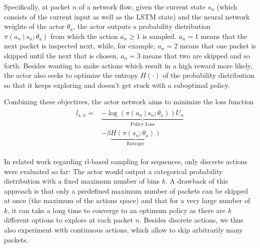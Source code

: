 \documentclass[conference]{IEEEtran}
\newcommand\givenbase[1][]{\:#1\lvert\:}
\let\given\givenbase
\begin{document}
Specifically, at packet $n$ of a network flow, given the current state $s_n$ (which consists of the current input as well as the LSTM state) and the neural network weights of the actor $\theta_a$, the actor outputs a probability distribution $\pi \left( a_n \given s_n ; \theta_\text{a} \right)$ from which the action $a_n \ge 1$ is sampled. $a_n=1$ means that the next packet is inspected next, while, for example, $a_n=2$ means that one packet is skipped until the next that is chosen, $a_n = 3$ means that two are skipped and so forth. Besides wanting to make actions which result in a high reward more likely, the actor also seeks to optimize the entropy $H(\cdot)$ of the probability distribution so that it keeps exploring and doesn't get stuck with a suboptimal policy.

Combining these objectives, the actor network aims to minimize the loss function
\begin{align}
\begin{split}
l_{\text{a},n} =& \underbrace{ -\log \left( \pi \left( a_n \given s_n ; \theta_\text{a} \right) \right) U_n}_{\text{Policy Loss}} \\
&- \beta \underbrace{H\left( \pi\left( s_n; \theta_a \right)\right) }_{\text{Entropy}}
\end{split}\label{eq:actor}
\end{align}


In related work regarding \gls{rl}-based sampling for sequences, only discrete actions were evaluated so far: The actor would output a categorical probability distribution with a fixed maximum number of bins $k$. A drawback of this approach is that only a predefined maximum number of packets can be skipped at once (the maximum of the actions space) and that for a very large number of $k$, it can take a long time to converge to an optimum policy as there are $k$ different options to explore at each packet $n$. Besides discrete actions, we thus also experiment with continuous actions, which allow to skip arbitrarily many packets. %
\end{document}
